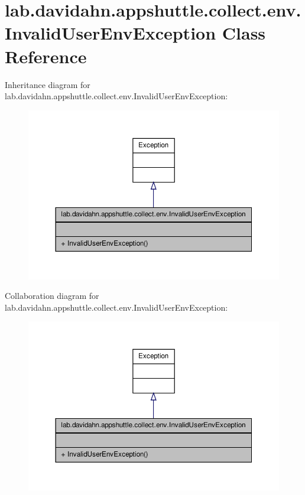 \hypertarget{classlab_1_1davidahn_1_1appshuttle_1_1collect_1_1env_1_1_invalid_user_env_exception}{\section{lab.\-davidahn.\-appshuttle.\-collect.\-env.\-Invalid\-User\-Env\-Exception \-Class \-Reference}
\label{classlab_1_1davidahn_1_1appshuttle_1_1collect_1_1env_1_1_invalid_user_env_exception}
}


\-Inheritance diagram for lab.\-davidahn.\-appshuttle.\-collect.\-env.\-Invalid\-User\-Env\-Exception\-:
\nopagebreak
\begin{figure}[H]
\begin{center}
\leavevmode
\includegraphics[width=350pt]{classlab_1_1davidahn_1_1appshuttle_1_1collect_1_1env_1_1_invalid_user_env_exception__inherit__graph}
\end{center}
\end{figure}


\-Collaboration diagram for lab.\-davidahn.\-appshuttle.\-collect.\-env.\-Invalid\-User\-Env\-Exception\-:
\nopagebreak
\begin{figure}[H]
\begin{center}
\leavevmode
\includegraphics[width=350pt]{classlab_1_1davidahn_1_1appshuttle_1_1collect_1_1env_1_1_invalid_user_env_exception__coll__graph}
\end{center}
\end{figure}
